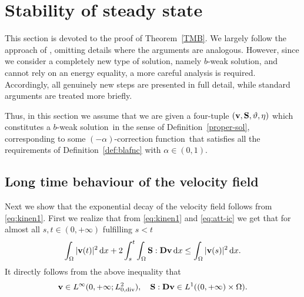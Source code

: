 \documentclass[11pt, a4paper, reqno]{amsart}
\numberwithin{equation}{section}
\newcommand{\diver}{\operatorname{div}}
\newcommand{\vc}[1]{{\bf #1}}
\newcommand{\vv}{\vc{v}}
\newcommand{\thet}{\vartheta}
\renewcommand{\S}{\mathbf{S}}
\newcommand{\D}{\mathbf{D}}
\newcommand{\dx}{\,{\rm d} {x}}
\newcommand{\intO}[1]{\int_{\Omega} #1 \dx}
\newcommand{\bb}{b}
\newcommand{\blafnc}{correction function}
\newcommand{\bws}{$\bb$-weak solution}
\begin{document}
\section{Stability of steady state}
  \label{sec:conv}

This section is devoted to the proof of Theorem~\ref{TMB}. 
We largely follow the approach of \cite{AbBuKa2024}, omitting details where the arguments are analogous. 
However, since we consider a completely new type of solution, namely \bws, 
and cannot rely on an energy equality, a more careful analysis is required. 
Accordingly, all genuinely new steps are presented in full detail, while standard arguments are treated more briefly.

Thus, in this section we assume that we are given a four-tuple $(\vv,\S,\thet,\eta)$ which constitutes a \bws\ in the sense of Definition~\ref{proper-sol}, corresponding to some $(-\alpha)$-\blafnc\ that satisfies all the requirements of Definition~\ref{def:blafnc} with $\alpha \in (0,1)$.


\subsection{Long time behaviour of the velocity field}\label{sec:vlt}
Next we show that the exponential decay of the velocity field follows from \eqref{eq:kinen1}. First we realize that from \eqref{eq:kinen1} and \eqref{eq:att-ic} we get that   for almost all $s,t\in(0,+\infty)$ fulfilling $s<t$ 
  \begin{equation}\label{eq:kinen}
\intO{|\vv(t)|^2} + 2\int_s^t\intO{\S:\D\vv} \leq \intO{|\vv(s)|^2}.
\end{equation}
It directly follows from the above inequality that
\begin{equation}\label{3.1.5}
  \vv \in L^{\infty}(0,+\infty; L^2_{0,\diver}),\quad \S:\D\vv\in L^1((0,+\infty)\times\Omega).
\end{equation}
\end{document}
